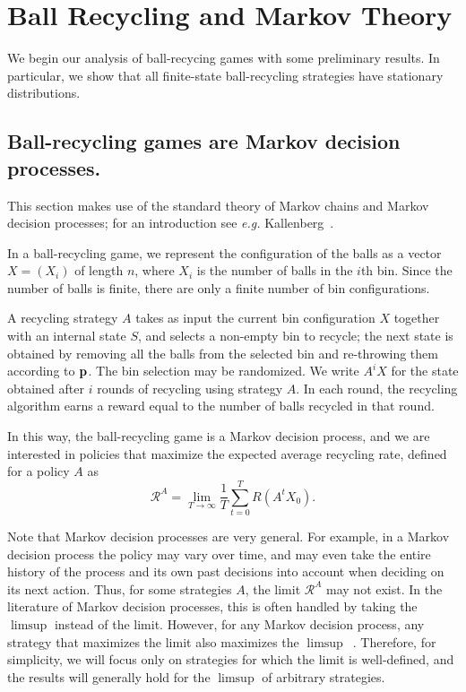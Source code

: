 \section{Ball Recycling and Markov Theory}\label{sec:br-prelim}

We begin our analysis of ball-recycing games with some preliminary results.  In
particular, we show that all finite-state ball-recycling strategies have
stationary distributions.

\subsection{Ball-recycling games are Markov decision processes.}\label{sec:br-mdps}

This section makes use of the standard theory of Markov chains and Markov
decision processes; for an introduction see {\it e.g.}
Kallenberg~\cite{Kallenberg16}.

In a ball-recycling game, we represent the configuration of the balls as a
vector $X=(X_i)$ of length $n$, where $X_i$ is the number of balls in the $i$th
bin.  Since the number of balls is finite, there are only a finite number of bin
configurations.

A recycling strategy $A$ takes as input the current bin configuration $X$
together with an internal state $S$, and selects a non-empty bin to recycle;
the next state is obtained by removing all the balls from the selected bin and
re-throwing them according to $\mathbf{p}$. The bin selection may be randomized.  We
write $A^iX$ for the state obtained after $i$ rounds of recycling using
strategy $A$.  In each round, the recycling algorithm earns a reward equal to
the number of balls recycled in that round.

In this way, the ball-recycling game is a Markov decision process, and we are
interested in policies that maximize the expected average recycling rate,
defined for a policy $A$ as
\begin{equation*}
	\mathcal{R}^A = \lim_{T\rightarrow\infty} \frac{1}{T}\sum_{t=0}^{T} R(A^tX_0).
\end{equation*}

Note that Markov decision processes are very general.  For example, in a Markov
decision process the policy may vary over time, and may even take the entire
history of the process and its own past decisions into account when deciding on
its next action.  Thus, for some strategies $A$, the limit $\mathcal{R}^A$ may
not exist.  In the literature of Markov decision processes, this is often
handled by taking the $\limsup$ instead of the limit. However, for any Markov
decision process, any strategy that maximizes the limit also maximizes the
$\limsup$~\cite{Kallenberg16}.  Therefore, for simplicity, we will focus only
on strategies for which the limit is well-defined, and the results will
generally hold for the $\limsup$ of arbitrary strategies.

